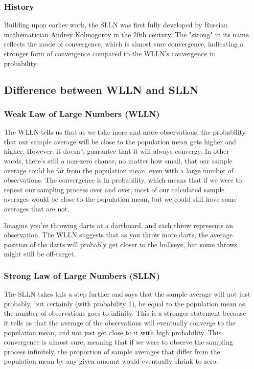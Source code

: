\documentclass{article}
\begin{document}
\subsubsection{History}
Building upon earlier work, the SLLN was first fully developed by Russian mathematician Andrey Kolmogorov in the 20th century. The "strong" in its name reflects the mode of convergence, which is almost sure convergence, indicating a stronger form of convergence compared to the WLLN's convergence in probability.

\subsection{Difference between WLLN and SLLN}

\subsubsection{Weak Law of Large Numbers (WLLN)}
The WLLN tells us that as we take more and more observations, the probability that our sample average will be close to the population mean gets higher and higher. However, it doesn't guarantee that it will always converge. In other words, there's still a non-zero chance, no matter how small, that our sample average could be far from the population mean, even with a large number of observations. The convergence is in probability, which means that if we were to repeat our sampling process over and over, most of our calculated sample averages would be close to the population mean, but we could still have some averages that are not.

Imagine you're throwing darts at a dartboard, and each throw represents an observation. The WLLN suggests that as you throw more darts, the average position of the darts will probably get closer to the bullseye, but some throws might still be off-target.

\subsubsection{Strong Law of Large Numbers (SLLN)}
The SLLN takes this a step further and says that the sample average will not just probably, but certainly (with probability 1), be equal to the population mean as the number of observations goes to infinity. This is a stronger statement because it tells us that the average of the observations will eventually converge to the population mean, and not just get close to it with high probability. This convergence is almost sure, meaning that if we were to observe the sampling process infinitely, the proportion of sample averages that differ from the population mean by any given amount would eventually shrink to zero.
\end{document}
